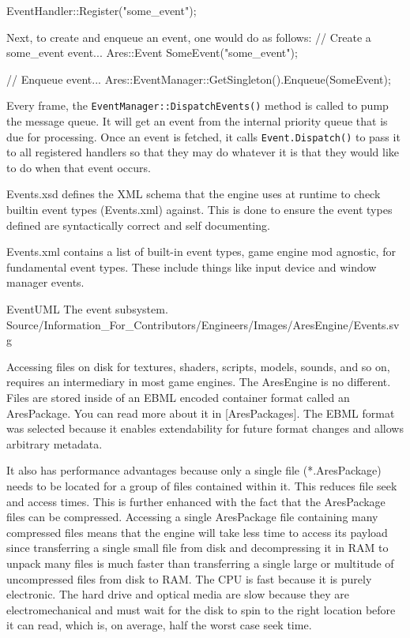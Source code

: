 \startCodeExample
EventHandler::Register("some_event");
\stopCodeExample

Next, to create and enqueue an event, one would do as follows:
\startCodeExample
// Create a some_event event...
Ares::Event SomeEvent("some_event");

// Enqueue event...
Ares::EventManager::GetSingleton().Enqueue(SomeEvent);
\stopCodeExample

Every frame, the {\tt EventManager::DispatchEvents()} method is called to pump the message queue. It will get an event from the internal priority queue that is due for processing. Once an event is fetched, it calls {\tt Event.Dispatch()} to pass it to all registered handlers so that they may do whatever it is that they would like to do when that event occurs.

Events.xsd defines the XML schema that the engine uses at runtime to check builtin event types (Events.xml) against. This is done to ensure the event types defined are syntactically correct and self documenting.

Events.xml contains a list of built-in event types, game engine mod agnostic, for fundamental event types. These include things like input device and window manager events.

\FullPageLandscapeDiagram
    {EventUML}
    {The event subsystem.}
    {Source/Information_For_Contributors/Engineers/Images/AresEngine/Events.svg}

\page 
{}
Accessing files on disk for textures, shaders, scripts, models, sounds, and so on, requires an intermediary in most game engines. The AresEngine is no different. Files are stored inside of an EBML encoded container format called an AresPackage. You can read more about it in [AresPackages]. The EBML format was selected because it enables extendability for future format changes and allows arbitrary metadata. 

It also has performance advantages because only a single file (*.AresPackage) needs to be located for a group of files contained within it. This reduces file seek and access times. This is further enhanced with the fact that the AresPackage files can be compressed. Accessing a single AresPackage file containing many compressed files means that the engine will take less time to access its payload since transferring a single small file from disk and decompressing it in RAM to unpack many files is much faster than transferring a single large or multitude of uncompressed files from disk to RAM. The CPU is fast because it is purely electronic. The hard drive and optical media are slow because they are electromechanical and must wait for the disk to spin to the right location before it can read, which is, on average, half the worst case seek time.

